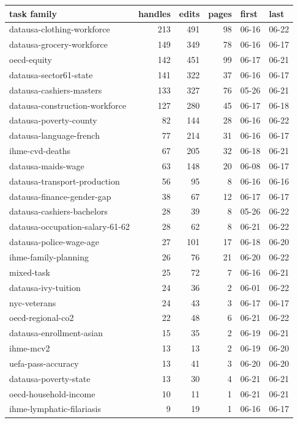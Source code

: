 \begin{tabular}{lrrrll}
\toprule
task family & handles & edits & pages & first & last \\
\midrule
datausa-clothing-workforce & 213 & 491 & 98 & 06-16 & 06-22 \\
datausa-grocery-workforce & 149 & 349 & 78 & 06-16 & 06-17 \\
oecd-equity & 142 & 451 & 99 & 06-17 & 06-21 \\
datausa-sector61-state & 141 & 322 & 37 & 06-16 & 06-17 \\
datausa-cashiers-masters & 133 & 327 & 76 & 05-26 & 06-21 \\
datausa-construction-workforce & 127 & 280 & 45 & 06-17 & 06-18 \\
datausa-poverty-county & 82 & 144 & 28 & 06-16 & 06-22 \\
datausa-language-french & 77 & 214 & 31 & 06-16 & 06-17 \\
ihme-cvd-deaths & 67 & 205 & 32 & 06-18 & 06-21 \\
datausa-maids-wage & 63 & 148 & 20 & 06-08 & 06-17 \\
datausa-transport-production & 56 & 95 & 8 & 06-16 & 06-16 \\
datausa-finance-gender-gap & 38 & 67 & 12 & 06-17 & 06-17 \\
datausa-cashiers-bachelors & 28 & 39 & 8 & 05-26 & 06-22 \\
datausa-occupation-salary-61-62 & 28 & 62 & 8 & 06-21 & 06-22 \\
datausa-police-wage-age & 27 & 101 & 17 & 06-18 & 06-20 \\
ihme-family-planning & 26 & 76 & 21 & 06-20 & 06-22 \\
mixed-task & 25 & 72 & 7 & 06-16 & 06-21 \\
datausa-ivy-tuition & 24 & 36 & 2 & 06-01 & 06-22 \\
nyc-veterans & 24 & 43 & 3 & 06-17 & 06-17 \\
oecd-regional-co2 & 22 & 48 & 6 & 06-21 & 06-22 \\
datausa-enrollment-asian & 15 & 35 & 2 & 06-19 & 06-21 \\
ihme-mcv2 & 13 & 13 & 2 & 06-19 & 06-20 \\
uefa-pass-accuracy & 13 & 41 & 3 & 06-20 & 06-20 \\
datausa-poverty-state & 13 & 30 & 4 & 06-21 & 06-21 \\
oecd-household-income & 10 & 11 & 1 & 06-21 & 06-21 \\
ihme-lymphatic-filariasis & 9 & 19 & 1 & 06-16 & 06-17 \\

\end{tabular}

